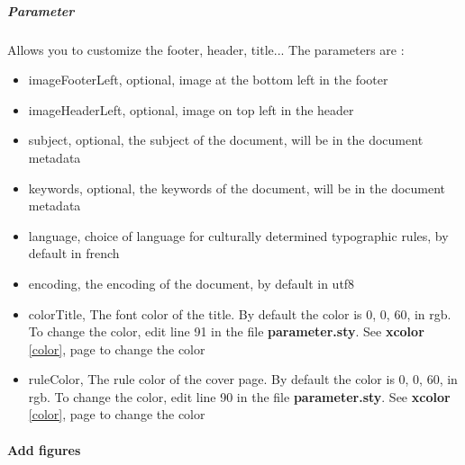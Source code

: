 \subparagraph{Parameter}
Allows you to customize the footer, header, title...
The parameters are :
\begin{itemize}
    \item imageFooterLeft, optional, image at the bottom left in the footer
    \item imageHeaderLeft, optional, image on top left in the header
    \item subject, optional, the subject of the document, will be in the document metadata
    \item keywords, optional, the keywords of the document, will be in the document metadata
    \item language, choice of language for culturally determined typographic rules, by default in
          french \label{language}
    \item encoding, the encoding of the document, by default in utf8
    \item colorTitle, The font color of the title. By default the color is 0, 0, 60, in rgb. To
          change the color, edit line 91 in the file \textbf{parameter.sty}. See \textbf{xcolor}
          \ref{color}, page \pageref{color} to change the color
    \item ruleColor, The rule color of the cover page. By default the color is 0, 0, 60, in rgb. To
          change the color, edit line 90 in the file \textbf{parameter.sty}. See \textbf{xcolor}
          \ref{color}, page \pageref{color} to change the color
\end{itemize}

\paragraph{Add figures}


